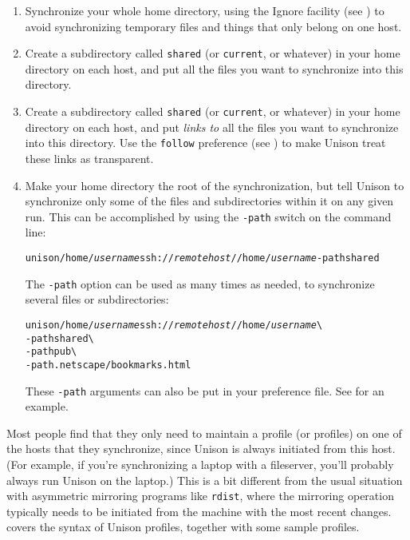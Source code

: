 \documentclass{article}
\newcommand{\NT}[1]{\textit{#1}}
\begin{document}
\begin{enumerate}
\item Synchronize your whole home directory, using the Ignore facility
(see )
to avoid synchronizing temporary files and things that only belong on
one host.
\item Create a subdirectory called {\tt shared} (or {\tt current}, or
whatever) in your home directory on each host, and put all the files
you want to synchronize into this directory.  
\item Create a subdirectory called {\tt shared} (or {\tt current}, or
whatever) in your home directory on each host, and put {\em links to}
all the files you want to synchronize into this directory.  Use the
{\tt follow} preference (see ) to make
Unison treat these links as transparent.
\item Make your home directory the root of the synchronization, but
tell Unison to synchronize only some of the files and subdirectories
within it on any given run.  This can be accomplished by using the {\tt -path} switch
on the command line:
\begin{alltt}
       unison /home/\NT{username} ssh://\NT{remotehost}//home/\NT{username} -path shared
\end{alltt}
The {\tt -path} option can be used as many times as needed, to 
synchronize several files or subdirectories:
\begin{alltt}
       unison /home/\NT{username} ssh://\NT{remotehost}//home/\NT{username} \verb|\|
          -path shared \verb|\|
          -path pub \verb|\|
          -path .netscape/bookmarks.html
\end{alltt}
These \verb|-path| arguments can also be put in your preference file.
See  for an example.
\end{enumerate}

Most people find that they only need to maintain a profile (or
profiles) on one of the hosts that they synchronize, since Unison is
always initiated from this host.  (For example, if you're
synchronizing a laptop with a fileserver, you'll probably always run
Unison on the laptop.)  This is a bit different from the usual
situation with asymmetric mirroring programs like \verb|rdist|, where
the mirroring operation typically needs to be initiated from the
machine with the most recent changes.  
covers the syntax of Unison profiles, together with some sample profiles.
\end{document}
